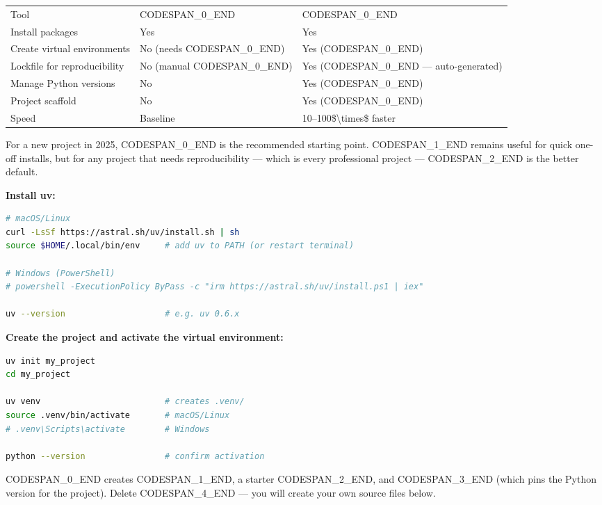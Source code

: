 \documentclass[11pt,a4paper]{book}
\begin{document}
\begin{tabular}{lll}
\hline
Tool & CODESPAN\_0\_END & CODESPAN\_0\_END \\
Install packages & Yes & Yes \\
Create virtual environments & No (needs CODESPAN\_0\_END) & Yes (CODESPAN\_0\_END) \\
Lockfile for reproducibility & No (manual CODESPAN\_0\_END) & Yes (CODESPAN\_0\_END --- auto-generated) \\
Manage Python versions & No & Yes (CODESPAN\_0\_END) \\
Project scaffold & No & Yes (CODESPAN\_0\_END) \\
Speed & Baseline & 10--100\$\textbackslash{}times\$ faster \\
\hline
\end{tabular}

For a new project in 2025, CODESPAN\_0\_END is the recommended starting point. CODESPAN\_1\_END remains useful for quick one-off installs, but for any project that needs reproducibility --- which is every professional project --- CODESPAN\_2\_END is the better default.

\textbf{Install uv:}

\begin{lstlisting}[language=Bash]
# macOS/Linux
curl -LsSf https://astral.sh/uv/install.sh | sh
source $HOME/.local/bin/env     # add uv to PATH (or restart terminal)

# Windows (PowerShell)
# powershell -ExecutionPolicy ByPass -c "irm https://astral.sh/uv/install.ps1 | iex"

uv --version                    # e.g. uv 0.6.x
\end{lstlisting}

\textbf{Create the project and activate the virtual environment:}

\begin{lstlisting}[language=Bash]
uv init my_project
cd my_project

uv venv                         # creates .venv/
source .venv/bin/activate       # macOS/Linux
# .venv\Scripts\activate        # Windows

python --version                # confirm activation
\end{lstlisting}

CODESPAN\_0\_END creates CODESPAN\_1\_END, a starter CODESPAN\_2\_END, and CODESPAN\_3\_END (which pins the Python version for the project). Delete CODESPAN\_4\_END --- you will create your own source files below.
\end{document}
